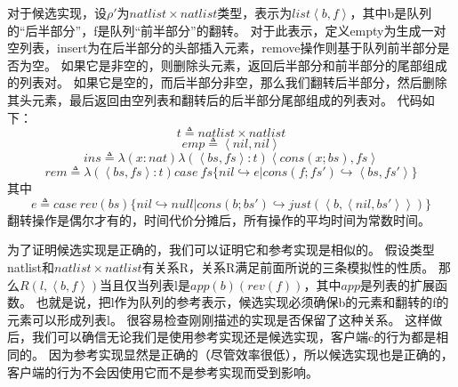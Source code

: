 对于候选实现，设$\rho'$为$natlist \times natlist$类型，表示为$list \left \langle b,f \right \rangle$，其中b是队列的“后半部分”，f是队列“前半部分”的翻转。 对于此表示，定义empty为生成一对空列表，insert为在后半部分的头部插入元素，remove操作则基于队列前半部分是否为空。
如果它是非空的，则删除头元素，返回后半部分和前半部分的尾部组成的列表对。
如果它是空的，而后半部分非空，那么我们翻转后半部分，然后删除其头元素，最后返回由空列表和翻转后的后半部分尾部组成的列表对。
代码如下：
$$t \triangleq natlist \times natlist$$
$$emp \triangleq \left \langle nil,nil \right \rangle $$
$$ins \triangleq \lambda(x:nat)\lambda(\left \langle bs,fs \right \rangle :t)\left \langle cons(x;bs),fs \right \rangle $$
$$rem \triangleq \lambda(\left \langle bs,fs \right \rangle :t)case\ fs
\{nil \hookrightarrow e|cons(f;fs') \hookrightarrow \left \langle bs,fs' \right \rangle\}$$
其中
$$e \triangleq case\ rev(bs)\{nil \hookrightarrow null|
cons(b;bs') \hookrightarrow just(\left \langle b,\left \langle nil,bs' \right \rangle \right \rangle)\}$$
翻转操作是偶尔才有的，时间代价分摊后，所有操作的平均时间为常数时间。

为了证明候选实现是正确的，我们可以证明它和参考实现是相似的。
假设类型natlist和$natlist \times natlist$有关系R，关系R满足前面所说的三条模拟性的性质。
那么$R(l,\left \langle b,f \right \rangle)$当且仅当列表l是$app(b)(rev(f))$，其中$app$是列表的扩展函数。
也就是说，把l作为队列的参考表示，候选实现必须确保b的元素和翻转的f的元素可以形成列表l。
很容易检查刚刚描述的实现是否保留了这种关系。
这样做后，我们可以确信无论我们是使用参考实现还是候选实现，客户端c的行为都是相同的。 因为参考实现显然是正确的（尽管效率很低），所以候选实现也是正确的，客户端的行为不会因使用它而不是参考实现而受到影响。
